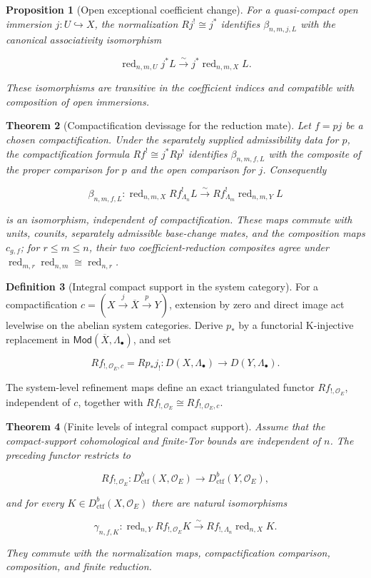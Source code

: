 \documentclass[10pt]{article}
\newtheorem{theorem}{Theorem}[section]
\newtheorem{proposition}[theorem]{Proposition}
\theoremstyle{definition}
\newtheorem{definition}[theorem]{Definition}
\newcommand{\OO}{\mathcal O}
\newcommand{\Dctf}{D^b_{\mathrm{ctf}}}
\newcommand{\red}{\operatorname{red}}
\begin{document}
\begin{proposition}[Open exceptional coefficient change]
For a quasi-compact open immersion \(j:U\hookrightarrow X\), the
normalization \(Rj^!\cong j^*\) identifies
\(\beta_{n,m,j,L}\) with the canonical associativity isomorphism

\[
 \red_{n,m,U}j^*L\xrightarrow{\sim}
 j^*\red_{n,m,X}L.
\]

These isomorphisms are transitive in the coefficient indices and compatible
with composition of open immersions.
\end{proposition}

\begin{theorem}[Compactification devissage for the reduction mate]
Let \(f=pj\) be a chosen compactification.  Under the separately supplied
admissibility data for \(p\), the compactification formula
\(Rf^!\cong j^*Rp^!\) identifies \(\beta_{n,m,f,L}\) with the composite of
the proper comparison for \(p\) and the open comparison for \(j\).
Consequently

\[
 \beta_{n,m,f,L}:\red_{n,m,X}Rf^!_{\Lambda_n}L
 \xrightarrow{\sim}
 Rf^!_{\Lambda_m}\red_{n,m,Y}L
\]

is an isomorphism, independent of compactification.  These maps commute with
units, counits, separately admissible base-change mates, and the composition
maps \(c_{g,f}\); for \(r\leq m\leq n\), their two coefficient-reduction
composites agree under
\(\red_{m,r}\red_{n,m}\cong\red_{n,r}\).
\end{theorem}

\begin{definition}[Integral compact support in the system category]
For a compactification
\(c=(X\xrightarrow j\overline X\xrightarrow pY)\), extension by zero and
direct image act levelwise on the abelian system categories.  Derive \(p_*\)
by a functorial K-injective replacement in
\(\mathsf{Mod}(\overline X,\Lambda_\bullet)\), and set

\[
 Rf_{!,\OO_E,c}=Rp_*j_!:
 D(X,\Lambda_\bullet)\longrightarrow D(Y,\Lambda_\bullet).
\]

The system-level refinement maps define an exact triangulated functor
\(Rf_{!,\OO_E}\), independent of \(c\), together with
\(Rf_{!,\OO_E}\cong Rf_{!,\OO_E,c}\).
\end{definition}

\begin{theorem}[Finite levels of integral compact support]
Assume that the compact-support cohomological and finite-Tor bounds are
independent of \(n\).  The preceding functor restricts to

\[
 Rf_{!,\OO_E}:\Dctf(X,\OO_E)\longrightarrow\Dctf(Y,\OO_E),
\]

and for every \(K\in\Dctf(X,\OO_E)\) there are natural isomorphisms

\[
 \gamma_{n,f,K}:\red_{n,Y}Rf_{!,\OO_E}K
 \xrightarrow{\sim}
 Rf_{!,\Lambda_n}\red_{n,X}K.
\]

They commute with the normalization maps, compactification comparison,
composition, and finite reduction.
\end{theorem}
\end{document}
